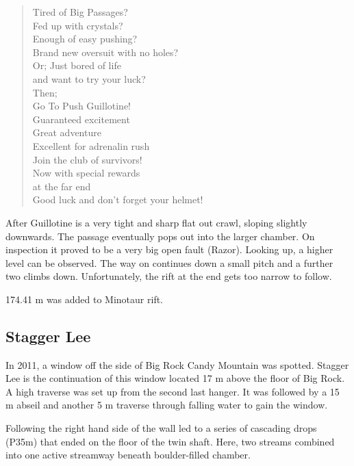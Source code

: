 \begin{verse}
Tired of Big Passages? \\
Fed up with crystals? \\
Enough of easy pushing? \\
Brand new oversuit with no holes? \\

Or; Just bored of life \\
   and want to try your luck? \\

Then; \\ 

Go To Push Guillotine! \\

Guaranteed excitement \\
Great adventure \\
Excellent for adrenalin rush \\

Join the club of survivors! \\

Now with special rewards \\
at the far end \\

Good luck and don't forget your helmet!
\end{verse}


After Guillotine is a very tight and sharp flat out crawl, sloping
slightly downwards. The passage eventually pops out into the larger
chamber. On inspection it proved to be a very big open fault (Razor).
Looking up, a higher level can be observed. The way on continues down a
small pitch and a further two climbs down. Unfortunately, the rift at
the end gets too narrow to follow.

174.41 m was added to Minotaur rift.

\subsection{Stagger Lee}\label{stagger-lee}

In 2011, a window off the side of Big Rock Candy Mountain was spotted.
Stagger Lee is the continuation of this window located 17 m above the
floor of Big Rock. A high traverse was set up from the second last
hanger. It was followed by a 15 m abseil and another 5 m traverse
through falling water to gain the window.

Following the right hand side of the wall led to a series of cascading
drops (P35m) that ended on the floor of the twin shaft. Here, two
streams combined into one active streamway beneath boulder-filled
chamber.

